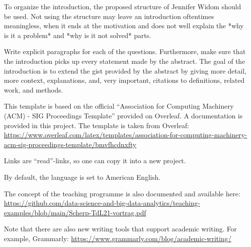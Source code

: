\documentclass[sigconf, nonacm]{acmart}
\begin{document}
\begin{tcolorbox}[title=Instructions: Write following this structure.]

To organize the introduction, the proposed structure of Jennifer Widom should be used. 
Not using the structure may leave an introduction oftentimes meaningless, when it ends at the motivation and does not well explain the *why is it a problem* and *why is it not solved* parts.

Write explicit paragraphs for each of the questions. 
Furthermore, make sure that the introduction picks up every statement made by the abstract.
The goal of the introduction is to extend the gist provided by the abstract by giving more detail, more context, explanations, and, very important, citations to definitions, related work, and methods.
\end{tcolorbox}

This template is based on the official ``Association for Computing Machinery (ACM) - SIG Proceedings Template'' provided on Overleaf. A documentation is provided in this project. The template is taken from Overleaf:
\url{https://www.overleaf.com/latex/templates/association-for-computing-machinery-acm-sig-proceedings-template/bmvfhcdnxfty}




Links are ``read''-links, so one can copy it into a new project.

By default, the language is set to American English.

The concept of the teaching programme is also documented and available here:
\url{https://github.com/data-science-and-big-data-analytics/teaching-examples/blob/main/Scherp-TdL21-vortrag.pdf}

Note that there are also new writing tools that support academic writing. 
For example, Grammarly: \url{https://www.grammarly.com/blog/academic-writing/}

\label{sec:introduction}
\end{document}
